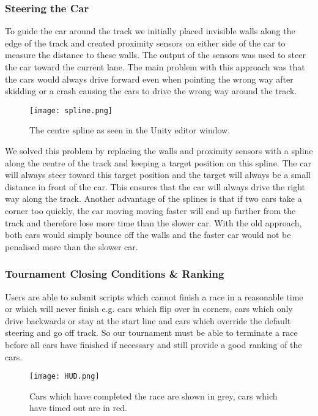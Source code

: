 
\subsubsection{Steering the Car}
To guide the car around the track we initially placed invisible walls along the edge of the track and created proximity sensors on either side of the car to measure the distance to these walls. The output of the sensors was used to steer the car toward the current lane. The main problem with this approach was that the cars would always drive forward even when pointing the wrong way after skidding or a crash causing the cars to drive the wrong way around the track.

\begin{figure}[H]
\centering
\texttt{[image: spline.png]}
\caption{The centre spline as seen in the Unity editor window.}
\end{figure}

We solved this problem by replacing the walls and proximity sensors with a spline along the centre of the track and keeping a target position on this spline. The car will always steer toward this target position and the target will always be a small distance in front of the car. This ensures that the car will always drive the right way along the track. Another advantage of the splines is that if two cars take a corner too quickly, the car moving moving faster will end up further from the track and therefore lose more time than the slower car. With the old approach, both cars would simply bounce off the walls and the faster car would not be penalised more than the slower car.

\subsubsection{Tournament Closing Conditions \& Ranking}
Users are able to submit scripts which cannot finish a race in a reasonable time or which will never finish e.g. cars which flip over in corners, cars which only drive backwards or stay at the start line and cars which override the default steering and go off track. So our tournament must be able to terminate a race before all cars have finished if necessary and still provide a good ranking of the cars.

\begin{figure}[H]
\centering
\texttt{[image: HUD.png]}
\caption{Cars which have completed the race are shown in grey, cars which have timed out are in red.}
\end{figure}

